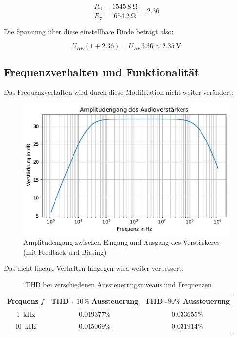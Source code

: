 \begin{equation}
    \frac{R_6}{R_7} = \frac{\SI{1545.8}{\ohm}}{\SI{654.2}{\ohm}} = 2.36
\end{equation}

Die Spannung über diese \lgqq einstellbare Diode\rgqq{} beträgt also:

\begin{equation}
    U_{BE} \left( 1 + 2.36 \right) = U_{BE} 3.36 \approx \SI{2.35}{\volt}
\end{equation}

\subsection{Frequenzverhalten und Funktionalität}

Das Frequenzverhalten wird durch diese Modifikation nicht weiter verändert:

\begin{figure}[H]
    \centering
    \includegraphics{tex/7_Leistungsverstaerker/pictures/Amplitudengang_AudioAmp.pdf}
    \caption{Amplitudengang zwischen Eingang und Ausgang des Verstärkeres (mit Feedback und Biasing)}
    \label{fig:my_label}
\end{figure}

Das nicht-lineare Verhalten hingegen wird weiter verbessert:

\begin{table}[H]
    \centering
    \begin{tabular}{|c||c||c|} \hline
         {Frequenz $f$} & {THD - $10\%$ Aussteuerung} & {THD -$80\%$ Aussteuerung} \\ \hline \hline
         \SI{1}{\kilo \hertz}& $0.019377\%$  & $0.033655\%$ \\ \hline
         \SI{10}{\kilo \hertz}& $0.015069\%$  & $0.031914\%$ \\ \hline
    \end{tabular}
    \caption{THD bei verschiedenen Aussteuerungsniveaus und Frequenzen}
    \label{tab:my_label}
\end{table}

